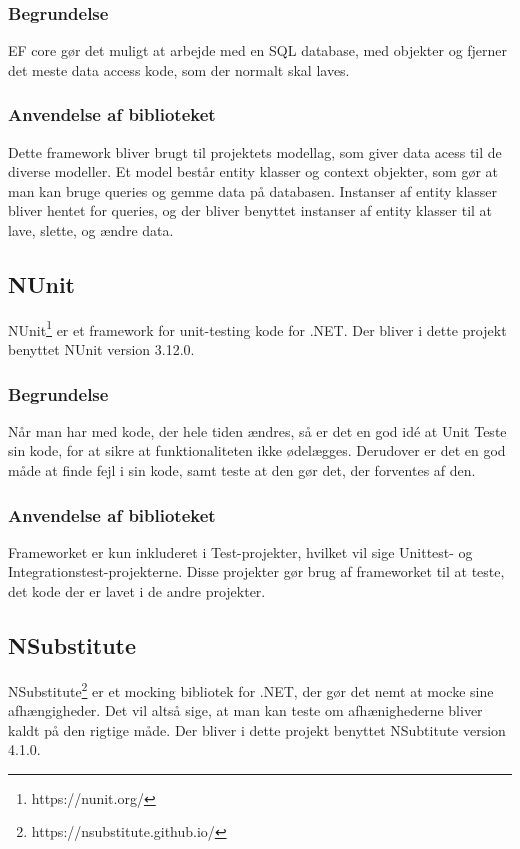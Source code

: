 \documentclass[Implementering/Implementering_main.tex]{subfiles}
\begin{document}
\subsubsection{Begrundelse}
EF core gør det muligt at arbejde med en SQL database, med objekter og fjerner det meste data access kode, som der normalt skal laves.

\subsubsection{Anvendelse af biblioteket}
Dette framework bliver brugt til projektets modellag, som giver data acess til de diverse modeller. Et model består entity klasser og context objekter, som gør at man kan bruge queries og gemme data på databasen. Instanser af entity klasser bliver hentet for queries, og der bliver benyttet instanser af entity klasser til at lave, slette, og ændre data.  





\subsection{NUnit}
NUnit\footnote{https://nunit.org/} er et framework for unit-testing kode for .NET. Der bliver i dette projekt benyttet NUnit version 3.12.0.  
\subsubsection{Begrundelse}
Når man har med kode, der hele tiden ændres, så er det en god idé at Unit Teste sin kode, for at sikre at funktionaliteten ikke ødelægges. Derudover er det en god måde at finde fejl i sin kode, samt teste at den gør det, der forventes af den.
\subsubsection{Anvendelse af biblioteket}
Frameworket er kun inkluderet i Test-projekter, hvilket vil sige Unittest- og Integrationstest-projekterne. Disse projekter gør brug af frameworket til at teste, det kode der er lavet i de andre projekter.

\subsection{NSubstitute}
NSubstitute\footnote{https://nsubstitute.github.io/} er et mocking bibliotek for .NET, der gør det nemt at mocke sine afhængigheder. Det vil altså sige, at man kan teste om afhænighederne bliver kaldt på den rigtige måde. Der bliver i dette projekt benyttet NSubtitute version 4.1.0. 
\end{document}
